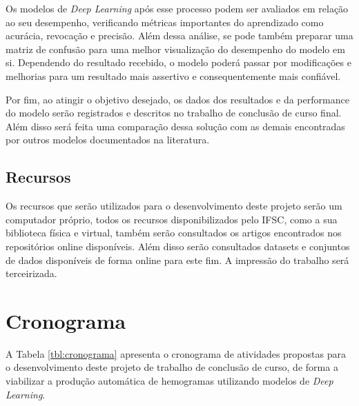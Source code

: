 Os modelos de \emph{Deep Learning} após esse processo podem ser avaliados em relação ao seu desempenho, verificando métricas importantes do aprendizado como acurácia, revocação e precisão. Além dessa análise, se pode também preparar uma matriz de confusão para uma melhor visualização do desempenho do modelo em si. Dependendo do resultado recebido, o modelo poderá passar por modificações e melhorias para um resultado mais assertivo e consequentemente mais confiável.

Por fim, ao atingir o objetivo desejado, os dados dos resultados e da performance do modelo serão registrados e descritos no trabalho de conclusão de curso final. Além disso será feita uma comparação dessa solução com as demais encontradas por outros modelos documentados na literatura.

\section{Recursos}
\label{chap:recursos}

Os recursos que serão utilizados para o desenvolvimento deste projeto serão um computador próprio, todos os recursos disponibilizados pelo IFSC, como a sua biblioteca física e virtual, também serão consultados os artigos encontrados nos repositórios online disponíveis. Além disso serão consultados datasets e conjuntos de dados disponíveis de forma online para este fim. A impressão do trabalho será terceirizada.

\chapter{Cronograma}
\label{chap:cronograma}

A Tabela \ref{tbl:cronograma} apresenta o cronograma de atividades propostas para o desenvolvimento deste projeto de trabalho de conclusão de curso, de forma a viabilizar a produção automática de hemogramas utilizando modelos de \emph{Deep Learning}.

